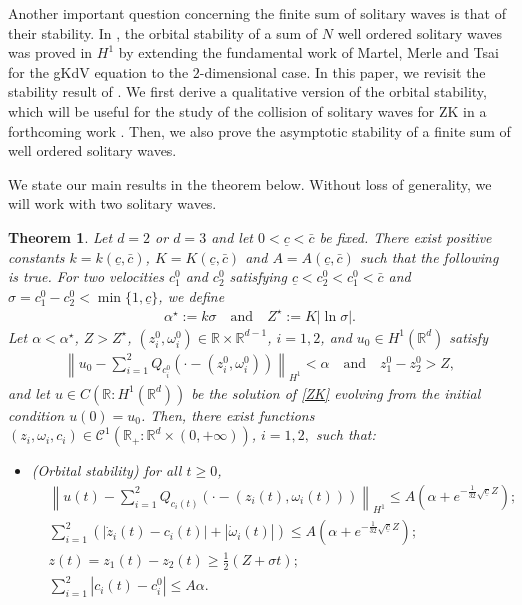 \documentclass[reqno,10pt]{amsart}
\newtheorem{theo}[lemm]{Theorem}
\numberwithin{equation}{section}
\begin{document}
	Another important question concerning the finite sum of solitary waves is that of their stability. In \cite{CMPS16}, the orbital stability of a sum of $N$ well ordered solitary waves was proved in $H^1$ by extending the fundamental work of Martel, Merle and Tsai \cite{MMT02} for the gKdV equation to the $2$-dimensional case. In this paper, we revisit the stability result of \cite{CMPS16}. We first derive a qualitative version of the orbital stability, which will be useful for the study of the collision of solitary waves for ZK in a forthcoming work \cite{PV23}. Then, we also prove the asymptotic stability of a finite sum of well ordered solitary waves. 
	
	We state our main results in the theorem below. Without loss of generality, we will work with two solitary waves. 
	
	
	\begin{theo}\label{theo:orbital} Let $d=2$ or $d=3$ and
		let $0<\underline{c}<\bar{c}$ be fixed. There exist positive constants $k=k(\underline{c},\bar{c})$, $K=K(\underline{c},\bar{c})$ and $A=A(\underline{c},\bar{c})$ such that the following is true. For two velocities $c_1^0$ and $c_2^0$ satisfying $\underline{c}<c_2^0<c_1^0<\bar{c}$ and $\sigma=c_1^0-c_2^0<\min\{1, \underline{c}\}$, we define
		\begin{align*}
			\alpha^\star:= k\sigma \quad \text{and} \quad Z^\star := K | \ln \sigma| .
		\end{align*}
		Let $\alpha<\alpha^\star$, $Z> Z^\star$, $(z_i^0, \omega_i^0) \in \mathbb{R} \times \mathbb{R}^{d-1}$, $i=1,2$, and $u_0 \in H^1(\mathbb{R}^d)$ satisfy
		\begin{align}\label{eq:IC}
			\left\| u_0 - \sum_{i=1}^2 Q_{c_i^0} \left( \cdot - \left( z_i^0, \omega_i^0 \right) \right) \right\|_{H^1} < \alpha \quad \text{and} \quad z_1^0-z_2^0 >Z,
		\end{align}
		and let $u \in C(\mathbb R: H^1(\mathbb R^d))$ be the solution of \eqref{ZK} evolving from the initial condition $u(0)=u_0$. Then, there exist functions $(z_i, \omega_i, c_i) \in \mathcal{C}^{1}(\mathbb{R}_+ : \mathbb{R}^d \times (0,+\infty))$, $i=1,2,$ such that: 
		\begin{itemize}
			\item[(i)] (Orbital stability) for all $t \ge 0$,
			\begin{align}
				&\left\| u(t) - \sum_{i=1}^2 Q_{c_i(t)} \left( \cdot - (z_i(t), \omega_i(t)) \right) \right\|_{H^1} \leq A \left( \alpha + e^{-\frac{1}{32} \sqrt{\underline{c}}Z }\right); \label{eq:u_orbital} \\
				&\sum_{i=1}^2 \left( \left\vert \dot{z}_i(t) -c_i(t) \right\vert + \left\vert \dot{\omega}_i(t) \right\vert \right) \leq    A \left( \alpha + e^{-\frac{1}{32} \sqrt{\underline{c}}Z }\right)  ; \label{eq:bound_dot:z_omega_i_t}\\
               & z(t)=z_1(t)-z_2(t)\geq \frac12(Z+ \sigma t) ;\label{defi:z} \\
                & \sum_{i=1}^2 \left\vert c_i(t) - c_i^0 \right\vert \leq  A \alpha .\label{eq:bound_c_i_t}
			\end{align}
  


\end{itemize}
\end{theo}
\end{document}
